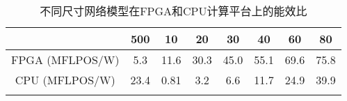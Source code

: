 \begin{center}
	\begin{table}[ht]
	\caption{不同尺寸网络模型在FPGA和CPU计算平台上的能效比}
	\renewcommand\arraystretch{1.2}
	\setlength{\tabcolsep}{12pt}
		\begin{tabular}{cccccccc}
	\toprule
						&	500		&	10		&	20		&	30		&	40		&	60		&	80		\\	\midrule
		FPGA (MFLPOS/W)	&	5.3		&	11.6	&	30.3	&	45.0	&	55.1	&	69.6	&	75.8	 \\	\hline
		CPU  (MFLPOS/W)	&	23.4	&	0.81	&	3.2		&	6.6		&	11.7	&	24.9	&	39.9	\\	
	\bottomrule
	\label{tab:narma10}
	\end{tabular}
\end{table}
\vspace{-3em}
\end{center}
